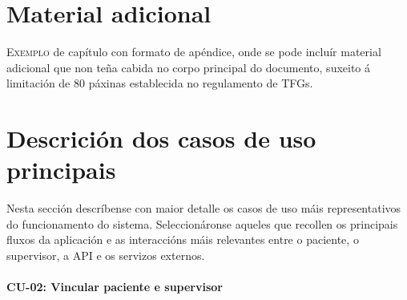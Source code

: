 \chapter{Material adicional}
\label{chap:adicional}

\lettrine{E}{xemplo} de capítulo con formato de apéndice, onde se pode
incluír material adicional que non teña cabida no corpo principal do
documento, suxeito á limitación de 80 páxinas establecida no
regulamento de TFGs.

\Blindtext


\chapter{Descrición dos casos de uso principais}
\label{chapapd:descricion-casos-principais}

Nesta sección descríbense con maior detalle os casos de uso máis representativos do funcionamento do sistema. Seleccionáronse aqueles que recollen os principais fluxos da aplicación e as interaccións máis relevantes entre o paciente, o supervisor, a API e os servizos externos.

\subsubsection{CU-02: Vincular paciente e supervisor}

